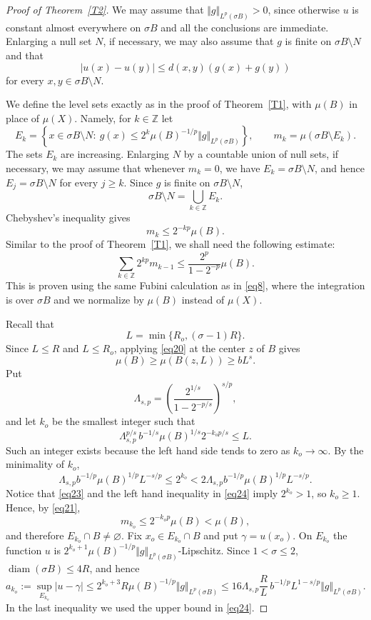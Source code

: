 \documentclass[10pt,a4paper]{amsart}
\newcommand{\bbbz}{\mathbb Z}
\def\diam{\operatorname{diam}}
\begin{document}
\begin{proof}[Proof of Theorem~\ref{T2}]
We may assume that $\Vert g\Vert_{L^p(\sigma B)}>0$, since otherwise $u$ is constant almost everywhere on $\sigma B$ and all the conclusions are immediate. Enlarging a null set $N$, if necessary, we may also assume that $g$ is finite on $\sigma B\setminus N$ and that
\[
 |u(x)-u(y)|\leq d(x,y)(g(x)+g(y))
\]
for every $x,y\in\sigma B\setminus N$.

We define the level sets exactly as in the proof of Theorem~\ref{T1}, with $\mu(B)$ in place of $\mu(X)$. Namely, for $k\in\bbbz$ let
\[
 E_k=\left\{x\in\sigma B\setminus N:\
 g(x)\leq 2^k\mu(B)^{-1/p}\Vert g\Vert_{L^p(\sigma B)}\right\},
 \qquad
 m_k=\mu(\sigma B\setminus E_k).
\]
The sets $E_k$ are increasing. Enlarging $N$ by a countable union of null sets, if necessary, we may assume that whenever $m_k=0$, we have $E_k=\sigma B\setminus N$, and hence $E_j=\sigma B\setminus N$ for every $j\geq k$. Since $g$ is finite on $\sigma B\setminus N$,
\[
 \sigma B\setminus N=\bigcup_{k\in\bbbz}E_k.
\]
Chebyshev's inequality gives
\begin{equation}
\label{eq21}
 m_k\leq 2^{-kp}\mu(B).
\end{equation}
Similar to the proof of Theorem~\ref{T1}, we shall need the following estimate:
\begin{equation}
\label{eq22}
 \sum_{k\in\bbbz}2^{kp}m_{k-1}
 \leq \frac{2^p}{1-2^{-p}}\mu(B).
\end{equation}
This is proven using the same Fubini calculation as in \eqref{eq8}, where the integration is over $\sigma B$ and we normalize by $\mu(B)$ instead of $\mu(X)$.


Recall that
\[
 L=\min\{R_o,(\sigma-1)R\}.
\]
Since $L\leq R$ and $L\leq R_o$, applying \eqref{eq20} at the center $z$ of $B$ gives
\begin{equation}
\label{eq23}
 \mu(B)\geq\mu(B(z,L))\geq bL^s.
\end{equation}
Put
\[
 \Lambda_{s,p}=\left(\frac{2^{1/s}}{1-2^{-p/s}}\right)^{s/p},
\]
and let $k_o$ be the smallest integer such that
\[
 \Lambda_{s,p}^{p/s}\,
 b^{-1/s}\mu(B)^{1/s}2^{-k_op/s}\leq L.
\]
Such an integer exists because the left hand side tends to zero as $k_o\to\infty$. By the minimality of $k_o$,
\begin{equation}
\label{eq24}
 \Lambda_{s,p}b^{-1/p}\mu(B)^{1/p}L^{-s/p}
 \leq2^{k_o}
 <2\Lambda_{s,p}b^{-1/p}\mu(B)^{1/p}L^{-s/p}.
\end{equation}
Notice that \eqref{eq23} and the left hand inequality in \eqref{eq24} imply $2^{k_o}>1$, so $k_o\geq1$. Hence, by \eqref{eq21},
\[
 m_{k_o}\leq2^{-k_op}\mu(B)<\mu(B),
\]
and therefore $E_{k_o}\cap B\ne\varnothing$. Fix $x_o\in E_{k_o}\cap B$ and put $\gamma=u(x_o)$. On $E_{k_o}$ the function $u$ is
$2^{k_o+1}\mu(B)^{-1/p}\Vert g\Vert_{L^p(\sigma B)}$-Lipschitz. Since $1<\sigma\leq2$,
$\diam(\sigma B)\leq4R$, and hence
\begin{equation}
\label{eq25}
 a_{k_o}:=\sup_{E_{k_o}}|u-\gamma|
 \leq2^{k_o+3}R\mu(B)^{-1/p}\Vert g\Vert_{L^p(\sigma B)}
 \leq 16\Lambda_{s,p}\frac RL\,b^{-1/p}L^{1-s/p}
 \Vert g\Vert_{L^p(\sigma B)}.
\end{equation}
In the last inequality we used the upper bound in \eqref{eq24}.


\end{proof}
\end{document}
